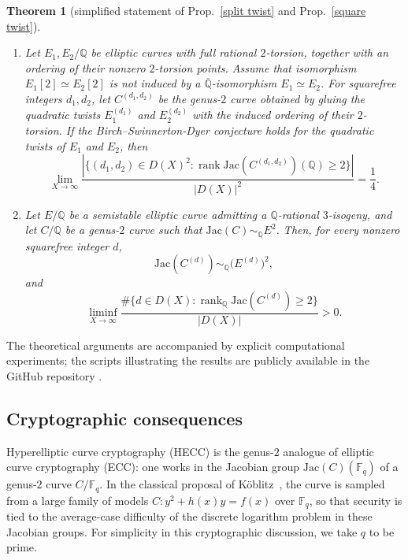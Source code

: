 \documentclass{amsart}
\newcommand{\F}{{\mathbb F}}
\newcommand{\Jac}{\mathrm{Jac}}
\DeclareMathOperator{\rank}{\mathrm{rank}}
\newtheorem{theorem}{Theorem}
\begin{document}
\begin{theorem}[simplified statement of Prop.~\ref{split twist} and Prop.~\ref{square twist}]\label{th:2}~\\

\begin{enumerate}
\item Let \(E_1,E_2/\mathbb Q\) be elliptic curves with full rational
\(2\)-torsion, together with an ordering of their nonzero \(2\)-torsion points.
Assume that isomorphism \(E_1[2]\simeq E_2[2]\) is not induced by
a \(\overline{\mathbb Q}\)-isomorphism \(E_1\simeq E_2\).
For squarefree integers \(d_1,d_2\), let \(C^{(d_1,d_2)}\) be the genus-\(2\)
curve obtained by gluing the quadratic twists \(E_1^{(d_1)}\) and
\(E_2^{(d_2)}\) with the induced ordering of their \(2\)-torsion. 
If the Birch--Swinnerton-Dyer conjecture holds for the quadratic twists of
\(E_1\) and \(E_2\), then
\[
\lim_{X\to\infty}
\frac{
\left|\{(d_1,d_2)\in D(X)^2:
\operatorname{rank}\Jac(C^{(d_1,d_2)})(\mathbb Q)\ge 2\}\right|
}{
|D(X)|^2
}
=
\frac14 .
\]

\item Let \(E/\mathbb Q\) be a semistable elliptic curve admitting a
\(\mathbb Q\)-rational \(3\)-isogeny, and let \(C/\mathbb Q\) be a genus-\(2\)
curve such that \(\Jac(C)\sim_{\mathbb Q}E^2\). Then, for every nonzero
squarefree integer \(d\),
\[
\Jac(C^{(d)})\sim_{\mathbb Q}\bigl(E^{(d)}\bigr)^2,
\]
and
\[
\liminf_{X\to\infty}
\frac{
\#\{d\in D(X): \rank_{\mathbb Q}\Jac(C^{(d)})\ge 2\}
}{
|D(X)|
}
>0.
\]
\end{enumerate}
\end{theorem}

The theoretical arguments are accompanied by explicit computational experiments;
the scripts illustrating the results are publicly available in the GitHub
repository \cite{OnlineComplement}.


\subsection{Cryptographic consequences}\label{ssec:crypto}

Hyperelliptic curve cryptography (HECC) is the genus-$2$ analogue of elliptic
curve cryptography (ECC): one works in the Jacobian group
$\Jac(C)(\F_q)$ of a genus-$2$ curve $C/\F_q$. In the classical proposal of
K\"oblitz~\cite{Koblitz1989}, the curve is sampled from a large family of models
$C:y^2+h(x)y=f(x)$ over $\F_q$, so that security is tied to the average-case
difficulty of the discrete logarithm problem in these Jacobian groups. For
simplicity in this cryptographic discussion, we take \(q\) to be prime.
\end{document}
